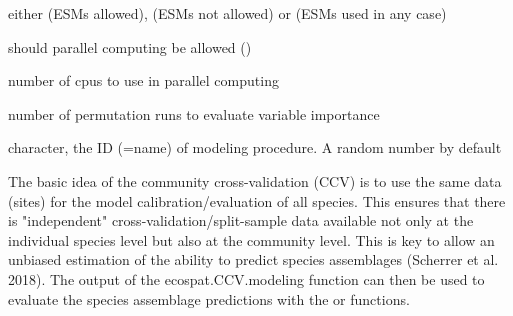 \documentclass[a4paper]{book}
\begin{document}
\begin{Arguments}
\begin{ldescription}
\item[\code{ESM}] either  (ESMs allowed),  (ESMs not allowed) or  (ESMs used in any case)
\item[\code{parallel}] should parallel computing be allowed ()
\item[\code{cpus}] number of cpus to use in parallel computing
\item[\code{VarImport}] number of permutation runs to evaluate variable importance
\item[\code{modeling.id}] character, the ID (=name) of modeling procedure. A random number by default
\end{ldescription}
\end{Arguments}
%
\begin{Details}\relax
The basic idea of the community cross-validation (CCV) is to use the same data (sites) for the model calibration/evaluation of all species. This ensures that there is "independent" cross-validation/split-sample data available not only at the individual species level but also at the community level. This is key to allow an unbiased estimation of the ability to predict species assemblages (Scherrer et al. 2018). 
The output of the ecospat.CCV.modeling function can then be used to evaluate the species assemblage predictions with the  or  functions.
\end{Details}
%
\end{document}

